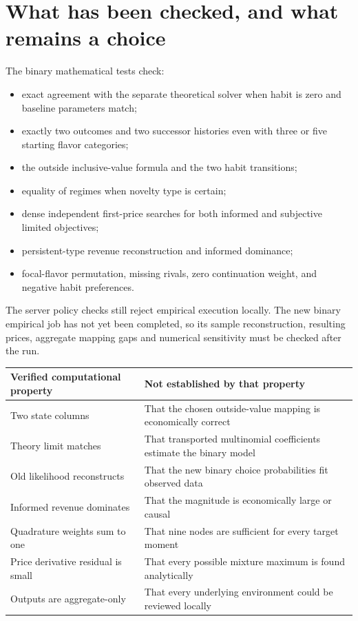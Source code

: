\documentclass[11pt]{article}
\begin{document}
\section{What has been checked, and what remains a choice}
The binary mathematical tests check:
\begin{itemize}
\item exact agreement with the separate theoretical solver when habit is zero and baseline parameters match;
\item exactly two outcomes and two successor histories even with three or five starting flavor categories;
\item the outside inclusive-value formula and the two habit transitions;
\item equality of regimes when novelty type is certain;
\item dense independent first-price searches for both informed and subjective limited objectives;
\item persistent-type revenue reconstruction and informed dominance;
\item focal-flavor permutation, missing rivals, zero continuation weight, and negative habit preferences.
\end{itemize}
The server policy checks still reject empirical execution locally. The new binary empirical job has not yet been completed, so its sample reconstruction, resulting prices, aggregate mapping gaps and numerical sensitivity must be checked after the run.

\begin{longtable}{p{}p{}}\toprule
Verified computational property & Not established by that property\\\midrule\endhead
Two state columns & That the chosen outside-value mapping is economically correct\\
Theory limit matches & That transported multinomial coefficients estimate the binary model\\
Old likelihood reconstructs & That the new binary choice probabilities fit observed data\\
Informed revenue dominates & That the magnitude is economically large or causal\\
Quadrature weights sum to one & That nine nodes are sufficient for every target moment\\
Price derivative residual is small & That every possible mixture maximum is found analytically\\
Outputs are aggregate-only & That every underlying environment could be reviewed locally\\\bottomrule
\end{longtable}
\end{document}
